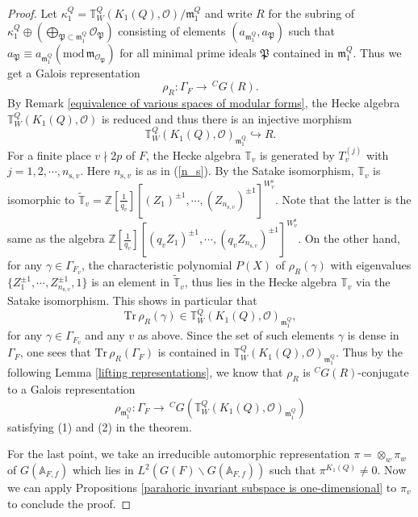 \documentclass[12pt,oneside,reqno]{amsart}
\theoremstyle{plain}
\newcommand{\xiaoyu}{\textcolor{red}}
\begin{document}
\begin{proof}
		Let
		$\kappa_1^Q
		=
		\mathbb{T}_W^{Q}(K_1(Q),\mathcal{O})/
		\mathfrak{m}_1^Q$
		and write
		$R$
		for the subring of
		$\kappa_1^Q
		\oplus
		\left(
		\bigoplus_{\mathfrak{P}
			\subset\mathfrak{m}_1^Q}
		\mathcal{O}_{\mathfrak{P}}
		\right)$
		consisting of elements
		$(a_{\mathfrak{m}_1^Q},a_\mathfrak{P})$
		such that
		$a_\mathfrak{P}  	
		\equiv
		a_{\mathfrak{m}_1^Q}
		(\mathrm{mod}\,\mathfrak{m}_{\mathcal{O}_\mathfrak{P}})$
		for all minimal prime ideals $\mathfrak{P}$
		contained in
		$\mathfrak{m}_1^Q$.
		Thus we get a Galois representation
		\[
		\rho_R
		\colon
		\Gamma_F
		\rightarrow
		\,
		^CG(R).
		\]
		By
		Remark
		\ref{equivalence of various spaces of modular forms},
		the
		Hecke algebra
		$\mathbb{T}_W^{Q}(K_1(Q),\mathcal{O})$
		is reduced and thus
		there is
		an injective morphism
		\[
		\mathbb{T}_W^{Q}(K_1(Q),\mathcal{O})_{\mathfrak{m}_1^Q}
		\hookrightarrow
		R.
		\]
		For a finite place
		$v\nmid2p$ of $F$,
		the Hecke algebra
		$\mathbb{T}_v$
		is generated by
		$T_v^{(j)}$
		with
		$j=1,2,\cdots,n_{\mathrm{s},v}$.
		Here
		$n_{\mathrm{s},v}$
		is as in
		(\ref{n_s}).
		By the Satake
		isomorphism,
		$\mathbb{T}_v$
		is isomorphic to
		$\widetilde{\mathbb{T}}_v
		=
		\mathbb{Z}[\frac{1}{q_v}]
		[(Z_1)^{\pm1},\cdots,(Z_{n_{\mathrm{s},v}})^{\pm1}]^{W_v^\mathrm{s}}$.
		Note that the latter is the same as
		the algebra
		$\mathbb{Z}[\frac{1}{q_v}]
		[(q_vZ_1)^{\pm1},\cdots,(q_vZ_{n_{\mathrm{s},v}})^{\pm1}]^{W_v^\mathrm{s}}$.
		On the other hand,
		for any
		$\gamma\in
		\Gamma_{F_v}$,
		the characteristic polynomial
		$P(X)$
		of
		$\rho_R(\gamma)$
		with eigenvalues
		$\{Z_1^{\pm1},\cdots,Z_{n_{\mathrm{s},v}}^{\pm1},1\}$
		is an element in
		$\widetilde{\mathbb{T}}_v$,
		thus lies in the Hecke algebra
		$\mathbb{T}_v$
		via the Satake isomorphism.
		This shows in particular that
		\[
		\mathrm{Tr}\,\rho_R(\gamma)\in
		\mathbb{T}_W^{Q}(K_1(Q),\mathcal{O})_{\mathfrak{m}_1^Q},
		\]
		for any
		$\gamma\in\Gamma_{F_v}$
		and any
		$v$ as above.
		Since the set of such elements $\gamma$
		is dense in
		$\Gamma_F$,
		one sees that
		$\mathrm{Tr}\,\rho_R(\Gamma_F)$
		is contained in
		$\mathbb{T}_W^{Q}(K_1(Q),\mathcal{O})_{\mathfrak{m}_1^Q}$.  	
		Thus by the following
		Lemma
		\ref{lifting representations},
		we know that
		$\rho_R$
		is
		$^CG(R)$-conjugate
		to a Galois representation
		\[
		\rho_{\mathfrak{m}_1^Q}
		\colon
		\Gamma_F
		\rightarrow
		\,
		^CG
		\left(
		\mathbb{T}_W^{Q}(K_1(Q),\mathcal{O})_{\mathfrak{m}_1^Q}
		\right)
		\]
		satisfying (1) and (2) in the
		theorem.  	
		
		
		
		
		For the last point, we take an irreducible automorphic representation $\pi=\otimes_w\pi_w$ of $G(\mathbb{A}_{F,f})$ which lies in $L^2(G(F)\backslash G(\mathbb{A}_{F,f}))$ such that
		$\pi^{K_1(Q)}\ne0$. 
		Now we can apply
		Propositions
		\ref{parahoric invariant subspace is one-dimensional} to $\pi_v$ to conclude the proof.
	\end{proof}
	
\end{document}
